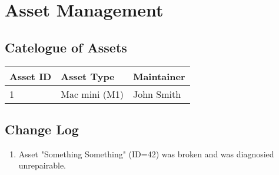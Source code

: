 \documentclass[a4paper,11pt]{article}
\begin{document}
    \section{Asset Management}

    \subsection{Catelogue of Assets}

    \begin{tabu} {|l|X[2]|X|}
        \hline
        {Asset ID} & {Asset Type} & {Maintainer} \\
        \hline
        {1} & {Mac mini (M1)} & {John Smith} \\
        \hline
    \end{tabu}

    \subsection{Change Log}

    \begin{enumerate}
        \item Asset "Something Something" (ID=42) was broken and was diagnosied unrepairable.
    \end{enumerate}
\end{document}
